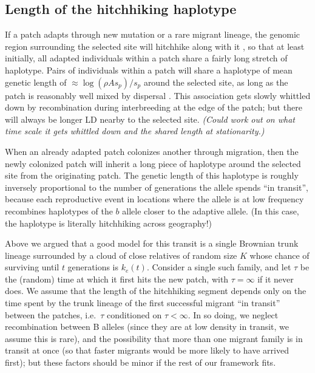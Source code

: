 \documentclass{article}
\newcommand{\plr}[1]{{\it\color{blue}(#1)}}
\begin{document}
\subsection{Length of the hitchhiking haplotype}
\label{ss:haplotype_length}

If a patch adapts through new mutation or a rare migrant lineage, the
genomic region surrounding the selected site will hitchhike along with
it \citep{maynardsmith1974hitchhiking},
so that at least initially, all adapted individuals within a patch
share a fairly long stretch of haplotype. 
Pairs of individuals within a patch will share a haplotype of mean genetic length of
$\approx \log(\rho A s_p)/s_p$ around the selected site, 
as long as the patch is reasonably well mixed by dispersal
\citep[otherwise see][]{barton2013genetic}.
This association gets slowly whittled down by recombination during interbreeding at the edge of the patch;
but there will always be longer LD nearby to the selected site. 
\plr{Could work out on what time scale it gets whittled down and the shared length at stationarity.}

When an already adapted patch colonizes another through migration,
then the newly colonized patch will inherit a long piece of haplotype around the selected site from the originating patch.
The genetic length of this haplotype is roughly inversely proportional to the
number of generations the allele spends ``in transit'', 
because each reproductive event in locations where the allele is at low frequency recombines haplotypes of the $b$ allele closer to the adaptive allele.
(In this case, the haplotype is literally hitchhiking across geography!)


Above we argued that a good model for this transit is a single Brownian trunk lineage
surrounded by a cloud of close relatives of random size $K$
whose chance of surviving until $t$ generations is $k_e(t)$.
Consider a single such family, and let $\tau$ be the (random) time at which it first hits the new patch,
with $\tau = \infty$ if it never does. 
We assume that the length of the hitchhiking segment depends only on 
the time spent by the trunk lineage of the first successful migrant ``in transit'' between the patches,
i.e.\ $\tau$ conditioned on $\tau < \infty$.
In so doing, we neglect 
recombination between B alleles (since they are at low density in transit, we assume this is rare),
and the possibility that more than one migrant family is in transit at once
(so that faster migrants would be more likely to have arrived first);
but these factors should be minor if the rest of our framework fits.
\end{document}
